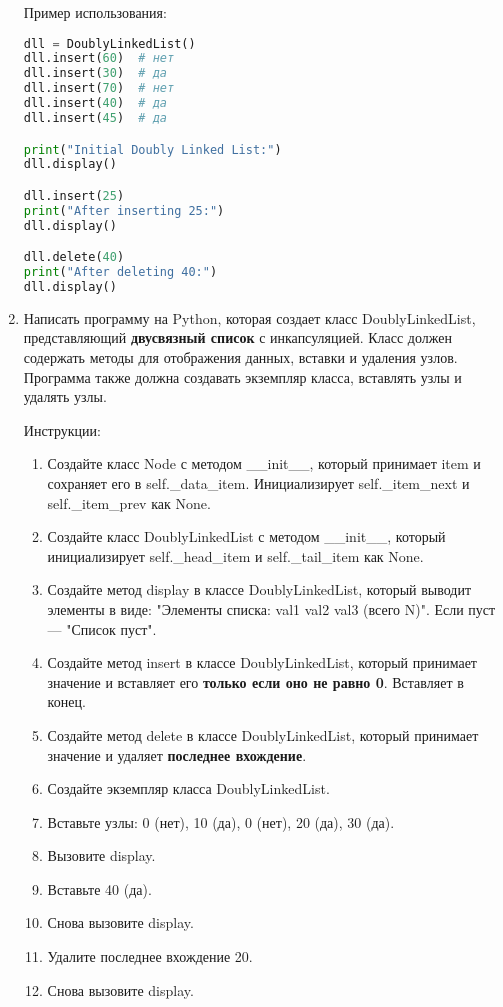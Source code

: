 \begin{enumerate}
Пример использования:
\begin{lstlisting}[language=Python]
dll = DoublyLinkedList()
dll.insert(60)  # нет
dll.insert(30)  # да
dll.insert(70)  # нет
dll.insert(40)  # да
dll.insert(45)  # да

print("Initial Doubly Linked List:")
dll.display()

dll.insert(25)
print("After inserting 25:")
dll.display()

dll.delete(40)
print("After deleting 40:")
dll.display()
\end{lstlisting}

\item Написать программу на Python, которая создает класс DoublyLinkedList, представляющий \textbf{двусвязный список} с инкапсуляцией. Класс должен содержать методы для отображения данных, вставки и удаления узлов. Программа также должна создавать экземпляр класса, вставлять узлы и удалять узлы.

Инструкции:
\begin{enumerate}
    \item Создайте класс Node с методом \_\_init\_\_, который принимает item и сохраняет его в self.\_data\_item. Инициализирует self.\_item\_next и self.\_item\_prev как None.
    \item Создайте класс DoublyLinkedList с методом \_\_init\_\_, который инициализирует self.\_head\_item и self.\_tail\_item как None.
    \item Создайте метод display в классе DoublyLinkedList, который выводит элементы в виде: "Элементы списка: val1 val2 val3 (всего N)". Если пуст — "Список пуст".
    \item Создайте метод insert в классе DoublyLinkedList, который принимает значение и вставляет его \textbf{только если оно не равно 0}. Вставляет в конец.
    \item Создайте метод delete в классе DoublyLinkedList, который принимает значение и удаляет \textbf{последнее вхождение}.
    \item Создайте экземпляр класса DoublyLinkedList.
    \item Вставьте узлы: 0 (нет), 10 (да), 0 (нет), 20 (да), 30 (да).
    \item Вызовите display.
    \item Вставьте 40 (да).
    \item Снова вызовите display.
    \item Удалите последнее вхождение 20.
    \item Снова вызовите display.
\end{enumerate}


\end{enumerate}
